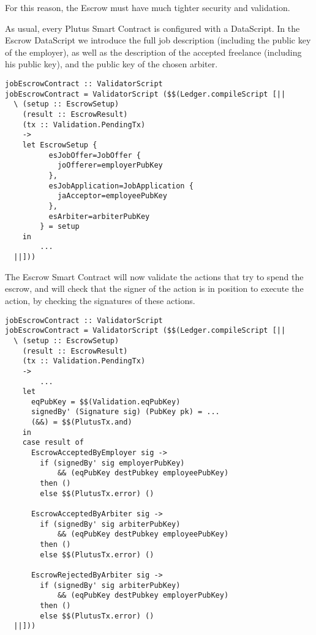 \documentclass{article}
\begin{document}
For this reason, the Escrow must have much tighter security and validation.

As usual, every Plutus Smart Contract is configured with a DataScript. In the Escrow DataScript we introduce the full job description (including the public key of the employer), as well as the description of the accepted freelance (including his public key), and the public key of the chosen arbiter.

\begin{samepage}
\begin{verbatim}
jobEscrowContract :: ValidatorScript
jobEscrowContract = ValidatorScript ($$(Ledger.compileScript [||
  \ (setup :: EscrowSetup)
    (result :: EscrowResult)
    (tx :: Validation.PendingTx)
    ->
    let EscrowSetup {
          esJobOffer=JobOffer {
            joOfferer=employerPubKey
          },
          esJobApplication=JobApplication {
            jaAcceptor=employeePubKey
          },
          esArbiter=arbiterPubKey
        } = setup
    in
		...
  ||]))
\end{verbatim}
\end{samepage}

The Escrow Smart Contract will now validate the actions that try to spend the escrow, and will check that the signer of the action is in position to execute the action, by checking the signatures of these actions.

\begin{samepage}
\begin{verbatim}
jobEscrowContract :: ValidatorScript
jobEscrowContract = ValidatorScript ($$(Ledger.compileScript [||
  \ (setup :: EscrowSetup)
    (result :: EscrowResult)
    (tx :: Validation.PendingTx)
    ->
		...
    let
      eqPubKey = $$(Validation.eqPubKey)
      signedBy' (Signature sig) (PubKey pk) = ...
      (&&) = $$(PlutusTx.and)
    in
    case result of
      EscrowAcceptedByEmployer sig ->
        if (signedBy' sig employerPubKey)
            && (eqPubKey destPubkey employeePubKey)
        then ()
        else $$(PlutusTx.error) ()

      EscrowAcceptedByArbiter sig ->
        if (signedBy' sig arbiterPubKey)
            && (eqPubKey destPubkey employeePubKey)
        then ()
        else $$(PlutusTx.error) ()

      EscrowRejectedByArbiter sig ->
        if (signedBy' sig arbiterPubKey)
            && (eqPubKey destPubkey employerPubKey)
        then ()
        else $$(PlutusTx.error) ()
  ||]))
\end{verbatim}
\end{samepage}
\end{document}
